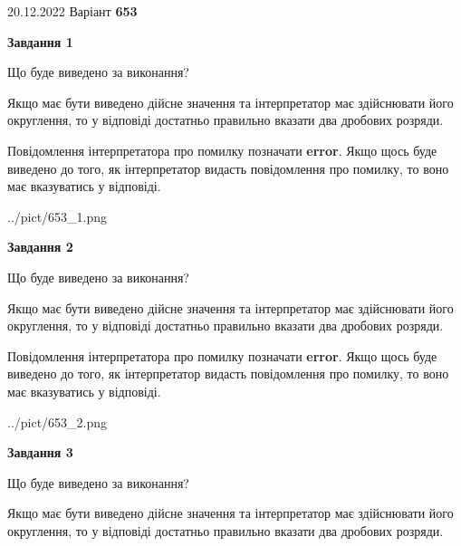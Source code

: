 \documentclass[12pt, ukrainian]{article}
\begin{document}
{20.12.2022 Варіант \No \textbf { 653 }\par}
{
\begin {Large}

{\begin {center}\textbf{Завдання 1}\end {center}}\par
Що буде виведено за виконання? \par

Якщо має бути виведено дійсне значення та інтерпретатор має здійснювати його округлення, 
то у відповіді достатньо правильно вказати два дробових розряди.

Повідомлення інтерпретатора про помилку позначати \textbf{error}.
Якщо щось буде виведено до того, як інтерпретатор видасть повідомлення про помилку, 
то воно має вказуватись у відповіді. \par

\begin{center}
	{../pict/653_1.png}
\end{center}
\newpage

{\begin {center}\textbf{Завдання 2}\end {center}}\par
Що буде виведено за виконання? \par

Якщо має бути виведено дійсне значення та інтерпретатор має здійснювати його округлення, 
то у відповіді достатньо правильно вказати два дробових розряди.

Повідомлення інтерпретатора про помилку позначати \textbf{error}.
Якщо щось буде виведено до того, як інтерпретатор видасть повідомлення про помилку, 
то воно має вказуватись у відповіді. \par

\begin{center}
	{../pict/653_2.png}
\end{center}
\newpage

{\begin {center}\textbf{Завдання 3}\end {center}}\par
Що буде виведено за виконання? \par

Якщо має бути виведено дійсне значення та інтерпретатор має здійснювати його округлення, 
то у відповіді достатньо правильно вказати два дробових розряди.


\end{Large}}
\end{document}
